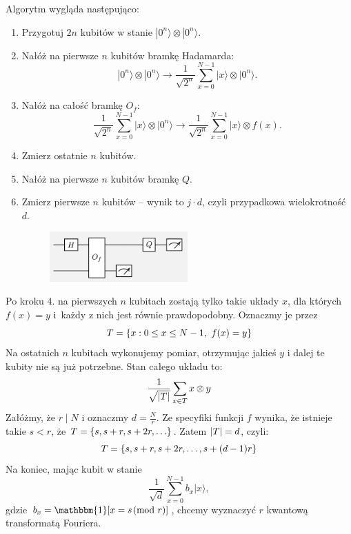 \newpage
Algorytm wygląda następująco:
\begin{greyframe}
    \begin{enumerate}
    \item Przygotuj \( 2n \) kubitów w stanie \( |0^n\rangle \otimes |0^n\rangle \).
    \item Nałóż na pierwsze \( n \) kubitów bramkę Hadamarda:
    \[
        |0^n\rangle \otimes |0^n\rangle \rightarrow \frac{1}{\sqrt{2^n}} \sum_{x=0}^{N-1} |x\rangle \otimes |0^n\rangle.
    \]
    \item Nałóż na całość bramkę \( O_f \):
    \[
        \frac{1}{\sqrt{2^n}} \sum_{x=0}^{N-1} |x\rangle \otimes |0^n\rangle \rightarrow \frac{1}{\sqrt{2^n}} \sum_{x=0}^{N-1} |x\rangle \otimes f(x).
    \]
    \item Zmierz ostatnie \( n \) kubitów.
    \item Nałóż na pierwsze \( n \) kubitów bramkę \( Q \).
    \item Zmierz pierwsze \( n \) kubitów -- wynik to \( j \cdot d \), czyli przypadkowa wielokrotność \( d \).
        \begin{figure}[H]
            \centering
            \includegraphics[width=0.5\textwidth]{img/shor_circuit.png}
        \end{figure}
    \end{enumerate}
\end{greyframe}
Po kroku 4. na pierwszych \( n \) kubitach zostają tylko takie układy \( x \), dla których \( f(x) = y \) i~każdy z nich jest równie prawdopodobny.
Oznaczmy je przez
\[
    T = \set{x : 0 \leq x \leq N-1,\ f(x) = y}
\]
Na ostatnich \( n \) kubitach wykonujemy pomiar, otrzymując jakieś \( y \) i dalej te kubity nie są już potrzebne. Stan całego układu to:
\[
    \frac{1}{\sqrt{\left\lvert T\right\rvert}} \sum_{x \in T} x \otimes y
\]
Załóżmy, że \( r \mid N \) i oznaczmy \( d = \frac{N}{r} \). Ze specyfiki funkcji \( f \) wynika, że istnieje takie \( s < r \), że \( T = \set{s, s + r, s + 2r, \ldots} \). Zatem \( \left\lvert T\right\rvert = d \), czyli:
\[
    T = \set{s, s + r, s + 2r, \ldots, s + (d - 1)r}
\]
Na koniec, mając kubit w stanie 
\[
    \frac{1}{\sqrt{d}} \sum_{x=0}^{N-1} b_x |x\rangle,
\]
gdzie \( b_x = \mathbbm{1}[x = s \!\!\pmod{r}] \), chcemy wyznaczyć \( r \) kwantową transformatą Fouriera.

